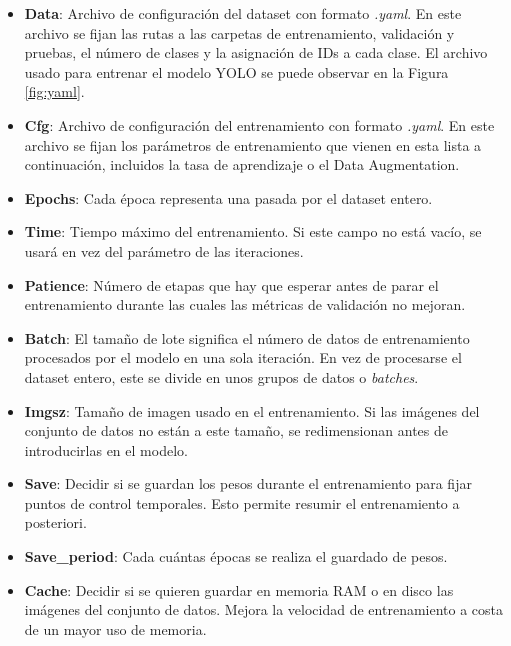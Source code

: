 \documentclass[12pt,a4paper,onecolumn,oneside]{report}
\begin{document}
\begin{itemize}
    \item \textbf{Data}: Archivo de configuración del dataset con formato \textit{.yaml}. En este archivo se fijan las rutas a las carpetas de entrenamiento, validación y pruebas, el número de clases y la asignación de IDs a cada clase. El archivo usado para entrenar el modelo YOLO se puede observar en la Figura \ref{fig:yaml}.

    \item \textbf{Cfg}: Archivo de configuración del entrenamiento con formato \textit{.yaml}. En este archivo se fijan los parámetros de entrenamiento que vienen en esta lista a continuación, incluidos la tasa de aprendizaje o el Data Augmentation.
    
    \item \textbf{Epochs}: Cada época representa una pasada por el dataset entero.
    
    \item \textbf{Time}: Tiempo máximo del entrenamiento. Si este campo no está vacío, se usará en vez del parámetro de las iteraciones.

    \item \textbf{Patience}: Número de etapas que hay que esperar antes de parar el entrenamiento durante las cuales las métricas de validación no mejoran.

    \item \textbf{Batch}: El tamaño de lote significa el número de datos de entrenamiento procesados por el modelo en una sola iteración. En vez de procesarse el dataset entero, este se divide en unos grupos de datos o \textit{batches}.

    \item \textbf{Imgsz}: Tamaño de imagen usado en el entrenamiento. Si las imágenes del conjunto de datos no están a este tamaño, se redimensionan antes de introducirlas en el modelo.

    \item \textbf{Save}: Decidir si se guardan los pesos durante el entrenamiento para fijar puntos de control temporales. Esto permite resumir el entrenamiento a posteriori.
    
    \item \textbf{Save\_period}: Cada cuántas épocas se realiza el guardado de pesos.

    \item \textbf{Cache}: Decidir si se quieren guardar en memoria RAM o en disco las imágenes del conjunto de datos. Mejora la velocidad de entrenamiento a costa de un mayor uso de memoria.


\end{itemize}
\end{document}
